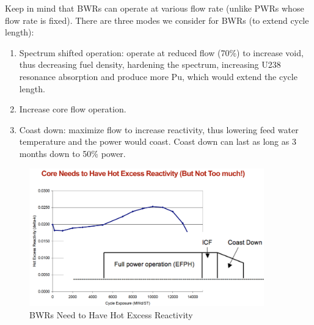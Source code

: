 \documentclass{school-22.211-notes}
\begin{document}
Keep in mind that BWRs can operate at various flow rate (unlike PWRs whose flow rate is fixed).  There are three modes we consider for BWRs (to extend cycle length): 
\begin{enumerate}
\item Spectrum shifted operation: operate at reduced flow (70\%) to increase void, thus decreasing fuel density, hardening the spectrum, increasing U238 resonance absorption and produce more Pu, which would extend the cycle length. 
\item Increase core flow operation.
\item Coast down: maximize flow to increase reactivity, thus lowering feed water temperature and the power would coast. Coast down can last as long as 3 months down to 50\% power. 
\end{enumerate}
  \begin{figure}[ht]
    \centering
    \includegraphics[width=4in]{images/design/BWR-excess-rho.png}
    \caption{BWRs Need to Have Hot Excess Reactivity} \label{BWR-excess-rho} 
    \end{figure}
\end{document}
